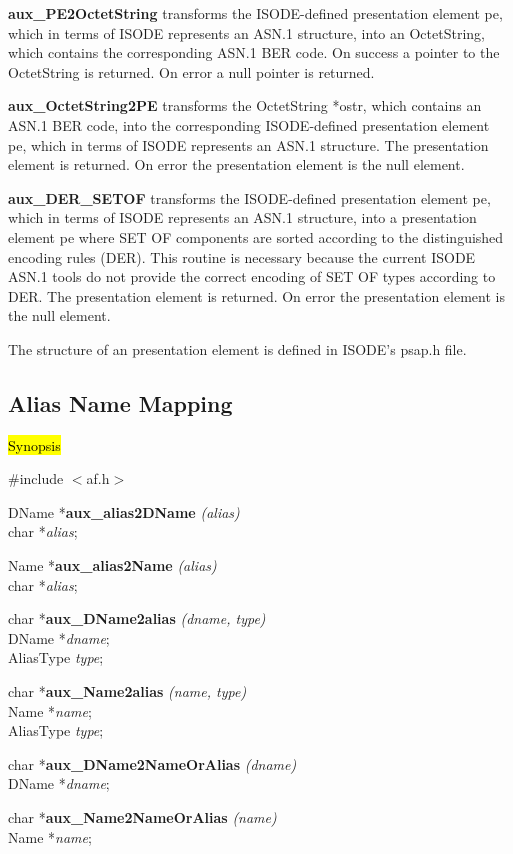 {\bf aux\_PE2OctetString}
transforms the ISODE-defined presentation element pe, which
in terms of ISODE represents an ASN.1 structure,
into an OctetString, which contains the corresponding ASN.1 BER code.
On success a pointer to the OctetString is returned.
On error a null pointer is returned.

{\bf aux\_OctetString2PE}
transforms the OctetString *ostr, which contains an ASN.1 BER code, into
the corresponding ISODE-defined presentation element pe, which
in terms of ISODE represents an ASN.1 structure.
The presentation element is returned.
On error the presentation element is the null element.

{\bf *aux\_DER\_SETOF}
transforms the ISODE-defined presentation element pe, which
in terms of ISODE represents an ASN.1 structure, 
into a presentation element pe where SET OF components are sorted according 
to the distinguished encoding rules (DER). This routine is necessary
because the current ISODE ASN.1 tools do not provide the correct encoding
of SET OF types according to DER.  
The presentation element is returned.
On error the presentation element is the null element.

The structure of an presentation element is defined in ISODE's psap.h file.


\subsection{Alias Name Mapping}
\label{aux_alias}
\hl{Synopsis}

\#include $<$af.h$>$ 

DName *{\bf aux\_alias2DName} {\em (alias)} \\
char *{\em alias}; 

Name *{\bf aux\_alias2Name} {\em (alias)} \\
char *{\em alias}; 

char *{\bf aux\_DName2alias} {\em (dname, type)} \\
DName *{\em dname}; \\
AliasType {\em type}; 

char *{\bf aux\_Name2alias} {\em (name, type)} \\
Name *{\em name}; \\
AliasType {\em type}; 

char *{\bf aux\_DName2NameOrAlias} {\em (dname)} \\
DName *{\em dname};

char *{\bf aux\_Name2NameOrAlias} {\em (name)} \\
Name *{\em name};

